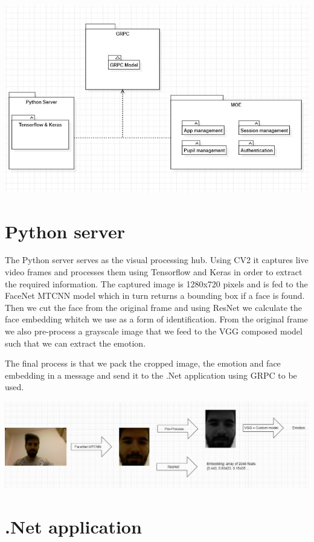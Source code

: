 \documentclass[runningheads,a4paper,11pt]{report}
\begin{document}
\includegraphics[width=\linewidth]{./Fig/OverallArchitecture.JPG}

\pagebreak
\section{Python server}
\label{section:pythonServer}

The Python server serves as the visual processing hub. Using CV2 it captures live video frames and processes them using Tensorflow and Keras in order to extract the required information.
The captured image is 1280x720 pixels and is fed to the FaceNet MTCNN model which in turn returns a bounding box if a face is found. Then we cut the face from the original frame and using ResNet we calculate the face embedding whitch we use as a form of identification. From the original frame we also pre-process a grayscale image that we feed to the VGG composed model such that we can extract the emotion. 

The final process is that we pack the cropped image, the emotion and face embedding in a message and send it to the .Net application using GRPC to be used.

\includegraphics[width=\linewidth]{./Fig/FacePipeline.JPG}

\pagebreak
\section{.Net application}
\label{section:pythonServer}
\end{document}
